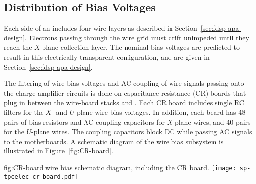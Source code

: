 \subsection{Distribution of Bias Voltages}
\label{sec:fdsp-tpcelec-design-bias}


Each side of an  includes four wire layers as described in Section~\ref{sec:fdsp-apa-design}. 
Electrons passing through the wire grid must drift unimpeded until they reach the $X$-plane 
collection layer. The nominal bias voltages are predicted to result in this electrically 
transparent configuration, and are given in Section~\ref{sec:fdsp-apa-design}. 

The filtering of wire bias voltages and AC coupling of wire signals passing
onto the charge amplifier circuits is done on capacitance-resistance (CR) boards that plug in between the  wire-board stacks and .
Each CR board includes single RC filters for the $X$- and $U$-plane wire bias voltages. In addition, each board has \num{48} 
pairs of bias resistors and AC coupling capacitors for $X$-plane wires, and \num{40} pairs for the $U$-plane wires. The coupling capacitors block DC while passing AC 
signals to the  motherboards.  A schematic diagram of the   wire bias subsystem is illustrated in Figure~\ref{fig:CR-board}.

\begin{dunefigure}
{fig:CR-board}
{  wire bias schematic diagram, including the CR board.}
\texttt{[image: sp-tpcelec-cr-board.pdf]}
\end{dunefigure}


